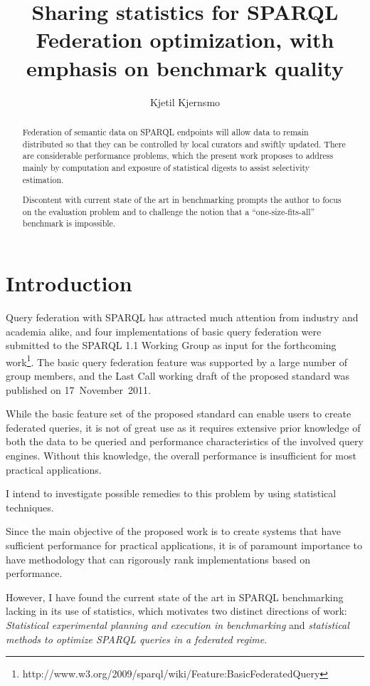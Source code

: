 \documentclass{llncs}
\title{Sharing statistics for SPARQL Federation optimization, with
  emphasis on benchmark quality}
\author{Kjetil Kjernsmo\inst{1}}
\institute{Department of Informatics,
Postboks 1080 Blindern,
0316 Oslo, Norway
\email{kjekje@ifi.uio.no}}
\begin{document}
\maketitle



\begin{abstract}
  Federation of semantic data on SPARQL endpoints will allow data to
  remain distributed so that they can be controlled by local curators
  and swiftly updated. There are considerable performance problems,
  which the present work proposes to address mainly by computation
  and exposure of statistical digests to assist selectivity
  estimation.

  Discontent with current state of the art in benchmarking prompts the
  author to focus on the evaluation problem and to challenge the
  notion that a ``one-size-fits-all'' benchmark is impossible.
\end{abstract}

\section{Introduction}

Query federation with SPARQL has attracted much attention
from industry and academia alike, and four implementations of basic
query federation were submitted to the SPARQL 1.1 Working Group as
input for the forthcoming
work\footnote{http://www.w3.org/2009/sparql/wiki/Feature:BasicFederatedQuery}. 
The basic query federation feature was
supported by a large number of group members, and the Last Call working
draft of the proposed standard was published on 17~November~2011.

While the basic feature set of the proposed standard can enable users
to create federated queries, it is not of great use as it requires
extensive prior knowledge of both the data to be queried and
performance characteristics of the involved query engines. Without
this knowledge, the overall performance is insufficient for most
practical applications.

I intend to investigate possible remedies to this problem by using
statistical techniques. 

Since the main objective of the proposed work is to create systems
that have sufficient performance for practical applications, it is of
paramount importance to have methodology that can rigorously rank
implementations based on performance.

However, I have found the current state of the art in SPARQL benchmarking
lacking in its use of statistics, which motivates two distinct
directions of work: \emph{Statistical experimental planning and execution in
benchmarking} and \emph{statistical methods to optimize SPARQL queries
in a federated regime}.
\end{document}
